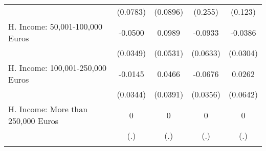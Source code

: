 {\begin{tabular}{l*{4}{c}}
            &    (0.0783)         &    (0.0896)         &     (0.255)         &     (0.123)         \\
[1em]
H. Income: 50,001-100,000 Euros&     -0.0500         &      0.0989         &     -0.0933         &     -0.0386         \\
            &    (0.0349)         &    (0.0531)         &    (0.0633)         &    (0.0304)         \\
[1em]
H. Income: 100,001-250,000 Euros&     -0.0145         &      0.0466         &     -0.0676         &      0.0262         \\
            &    (0.0344)         &    (0.0391)         &    (0.0356)         &    (0.0642)         \\
[1em]
H. Income: More than 250,000 Euros&           0         &           0         &           0         &           0         \\
            &         (.)         &         (.)         &         (.)         &         (.)         \\
\hline\hline
{}\\
\end{tabular}
}
